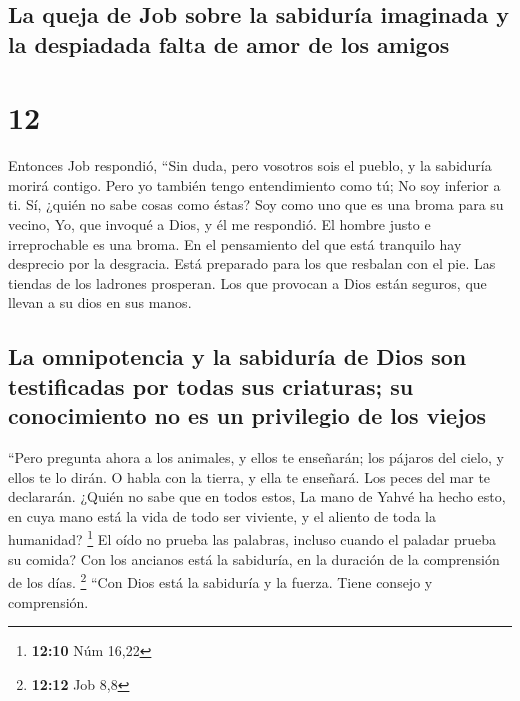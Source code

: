 \hypertarget{la-queja-de-job-sobre-la-sabiduruxeda-imaginada-y-la-despiadada-falta-de-amor-de-los-amigos}{%
\subsection{La queja de Job sobre la sabiduría imaginada y la despiadada
falta de amor de los
amigos}\label{la-queja-de-job-sobre-la-sabiduruxeda-imaginada-y-la-despiadada-falta-de-amor-de-los-amigos}}

\hypertarget{section-11}{%
\section{12}\label{section-11}}

 Entonces Job respondió,  ``Sin duda, pero
vosotros sois el pueblo, y la sabiduría morirá contigo. 
Pero yo también tengo entendimiento como tú; No soy inferior a ti. Sí,
¿quién no sabe cosas como éstas?  Soy como uno que es una
broma para su vecino, Yo, que invoqué a Dios, y él me respondió. El
hombre justo e irreprochable es una broma.  En el
pensamiento del que está tranquilo hay desprecio por la desgracia. Está
preparado para los que resbalan con el pie.  Las tiendas
de los ladrones prosperan. Los que provocan a Dios están seguros, que
llevan a su dios en sus manos.

\hypertarget{la-omnipotencia-y-la-sabiduruxeda-de-dios-son-testificadas-por-todas-sus-criaturas-su-conocimiento-no-es-un-privilegio-de-los-viejos}{%
\subsection{La omnipotencia y la sabiduría de Dios son testificadas por
todas sus criaturas; su conocimiento no es un privilegio de los
viejos}\label{la-omnipotencia-y-la-sabiduruxeda-de-dios-son-testificadas-por-todas-sus-criaturas-su-conocimiento-no-es-un-privilegio-de-los-viejos}}

 ``Pero pregunta ahora a los animales, y ellos te
enseñarán; los pájaros del cielo, y ellos te lo dirán.  O
habla con la tierra, y ella te enseñará. Los peces del mar te
declararán.  ¿Quién no sabe que en todos estos, La mano de
Yahvé ha hecho esto,  en cuya mano está la vida de todo
ser viviente, y el aliento de toda la humanidad? \footnote{\textbf{12:10}
  Núm 16,22}  El oído no prueba las palabras, incluso
cuando el paladar prueba su comida?  Con los ancianos
está la sabiduría, en la duración de la comprensión de los días.
\footnote{\textbf{12:12} Job 8,8}  ``Con Dios está la
sabiduría y la fuerza. Tiene consejo y comprensión.

